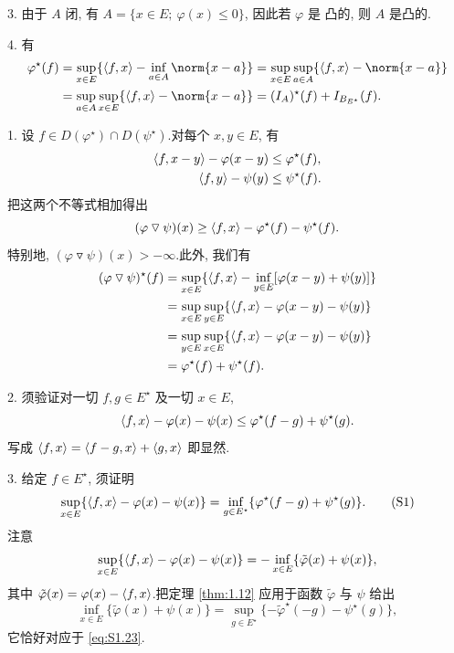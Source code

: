 3. 由于 $A$ 闭, 有 $A=\{x\in E;\ \varphi(x)\le0\}$, 因此若 $\varphi$ 是
凸的, 则 $A$ 是凸的.

4. 有
\begin{align*}
\varphi^\star(f)&=\sup_{x\in E}\{\dual{f}{x}-\inf_{a\in A}\norm{x-a}\}
=\sup_{x\in E}\sup_{a\in A}\{\dual{f}{x}-\norm{x-a}\}\\
&=\sup_{a\in A}\sup_{x\in E}\{\dual{f}{x}-\norm{x-a}\}
=(I_A)^\star(f)+I_{B_{E^\star}}(f).
\end{align*}


1. 设 $f\in D(\varphi^\star)\cap D(\psi^\star)$.对每个 $x,y\in E$, 有
\begin{align*}
\left\langle f,x-y\right\rangle-\varphi(x-y)&\le\varphi^\star(f),\\
\left\langle f,y\right\rangle-\psi(y)&\le\psi^\star(f).
\end{align*}
把这两个不等式相加得出
\begin{equation*}
(\varphi\mathbin{\triangledown}\psi)(x)\ge\left\langle f,x\right\rangle-\varphi^\star(f)-\psi^\star(f).
\end{equation*}
特别地, $(\varphi\mathbin{\triangledown}\psi)(x)>-\infty$.此外, 我们有
\begin{align*}
(\varphi\mathbin{\triangledown}\psi)^\star(f)
&=\sup_{x\in E}\{\left\langle f,x\right\rangle-\inf_{y\in E}[\varphi(x-y)+\psi(y)]\}\\
&=\sup_{x\in E}\sup_{y\in E}\{\left\langle f,x\right\rangle-\varphi(x-y)-\psi(y)\}\\
&=\sup_{y\in E}\sup_{x\in E}\{\left\langle f,x\right\rangle-\varphi(x-y)-\psi(y)\}\\
&=\varphi^\star(f)+\psi^\star(f).
\end{align*}

2. 须验证对一切 $f,g\in E^\star$ 及一切 $x\in E$,
\begin{equation*}
\left\langle f,x\right\rangle-\varphi(x)-\psi(x)\le\varphi^\star(f-g)+\psi^\star(g).
\end{equation*}
写成 $\left\langle f,x\right\rangle=\left\langle f-g,x\right\rangle+\left\langle g,x\right\rangle$ 即显然.

3. 给定 $f\in E^\star$, 须证明
\begin{equation}
\sup_{x\in E}\{\left\langle f,x\right\rangle-\varphi(x)-\psi(x)\}
=\inf_{g\in E^\star}\{\varphi^\star(f-g)+\psi^\star(g)\}.
\tag{S1}
\label{eq:S1.23}
\end{equation}
注意
\begin{equation*}
\sup_{x\in E}\{\left\langle f,x\right\rangle-\varphi(x)-\psi(x)\}
=-\inf_{x\in E}\{\tilde\varphi(x)+\psi(x)\},
\end{equation*}
其中 $\tilde\varphi(x)=\varphi(x)-\left\langle f,x\right\rangle$.把定理  \ref{thm:1.12}
应用于函数 $\tilde\varphi$ 与 $\psi$ 给出
\begin{equation*}
\inf_{x\in E}\{\tilde\varphi(x)+\psi(x)\}
=\sup_{g\in E^\star}\{-\tilde\varphi^\star(-g)-\psi^\star(g)\},
\end{equation*}
它恰好对应于 \eqref{eq:S1.23}.

